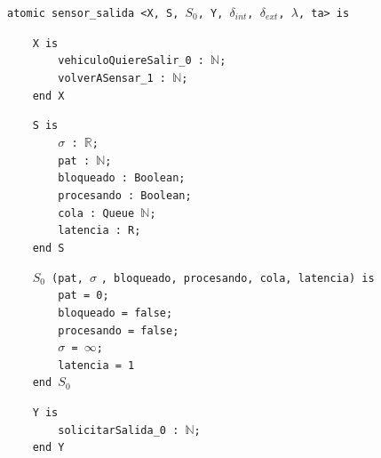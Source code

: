 \documentclass[12pt]{article}
\begin{document}
\begin{tcolorbox}[
    colback=black!5!white,
    colframe=black!80!white,
    boxrule=0.8pt,
    arc=2pt,
    left=5pt,
    right=5pt,
    top=5pt,
    bottom=5pt,
    fontupper=\ttfamily,
    breakable
]
\begin{flushleft}
\texttt{atomic sensor\_salida <X, S, $S_0$, Y, }$\delta_{int}$\texttt{, }$\delta_{ext}$\texttt{, }$\lambda$\texttt{, ta> is}
\end{flushleft}

\begin{flushleft}
\texttt{~~~~X is} \\
\texttt{~~~~~~~~vehiculoQuiereSalir\_0 : }\(\mathbb{N}\)\texttt{;} \\
\texttt{~~~~~~~~volverASensar\_1 : }\(\mathbb{N}\)\texttt{;} \\
\texttt{~~~~end X}
\end{flushleft}

\begin{flushleft}
\texttt{~~~~S is} \\
\texttt{~~~~~~~~}$\sigma$\texttt{ : }\(\mathbb{R}\)\texttt{;} \\
\texttt{~~~~~~~~pat : }\(\mathbb{N}\)\texttt{;} \\
\texttt{~~~~~~~~bloqueado : Boolean;} \\
\texttt{~~~~~~~~procesando : Boolean;} \\
\texttt{~~~~~~~~cola : Queue }\(\mathbb{N}\)\texttt{;} \\
\texttt{~~~~~~~~latencia : R;} \\
\texttt{~~~~end S}
\end{flushleft}

\begin{flushleft}
\texttt{~~~~$S_0$ (pat, }$\sigma$ \texttt{, bloqueado, procesando, cola, latencia) is} \\
\texttt{~~~~~~~~pat = 0;} \\
\texttt{~~~~~~~~bloqueado = false;} \\
\texttt{~~~~~~~~procesando = false;} \\
\texttt{~~~~~~~~}$\sigma$\texttt{ = }$\infty$\texttt{;} \\
\texttt{~~~~~~~~latencia = 1 } \\
\texttt{~~~~end }$S_0$
\end{flushleft}

\begin{flushleft}
\texttt{~~~~Y is} \\
\texttt{~~~~~~~~solicitarSalida\_0 : }\(\mathbb{N}\)\texttt{;} \\
\texttt{~~~~end Y}
\end{flushleft}


\end{tcolorbox}
\end{document}
